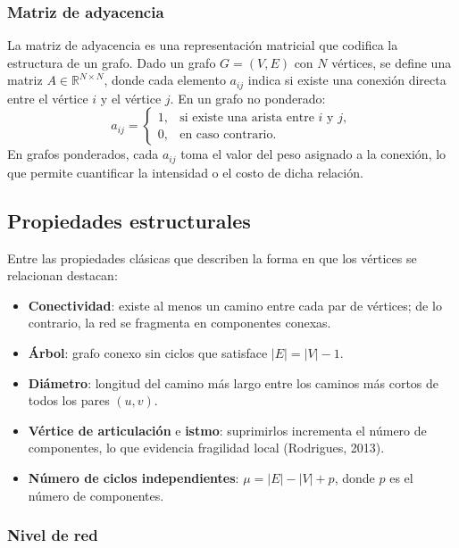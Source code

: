         \subsubsection{Matriz de adyacencia}
            La matriz de adyacencia es una representación matricial que codifica la estructura de un grafo. Dado un grafo $G=(V,E)$ con $N$ vértices, se define una matriz $A \in \mathbb{R}^{N \times N}$, donde cada elemento $a_{ij}$ indica si existe una conexión directa entre el vértice $i$ y el vértice $j$. En un grafo no ponderado:
            \begin{equation}
                a_{ij} =
                \begin{cases}
                    1, & \text{si existe una arista entre } i \text{ y } j,\\
                    0, & \text{en caso contrario.}
                \end{cases}
            \end{equation}
            En grafos ponderados, cada $a_{ij}$ toma el valor del peso asignado a la conexión, lo que permite cuantificar la intensidad o el costo de dicha relación.

    \subsection{Propiedades estructurales}

    Entre las propiedades clásicas que describen la forma en que los vértices se relacionan destacan:
    \begin{itemize}
        \item \textbf{Conectividad}: existe al menos un camino entre cada par de vértices; de lo contrario, la red se fragmenta en componentes conexas.
        \item \textbf{Árbol}: grafo conexo sin ciclos que satisface $|E|=|V|-1$.
        \item \textbf{Diámetro}: longitud del camino más largo entre los caminos más cortos de todos los pares $(u,v)$.
        \item \textbf{Vértice de articulación} e \textbf{istmo}: suprimirlos incrementa el número de componentes, lo que evidencia fragilidad local (Rodrigues, 2013).
        \item \textbf{Número de ciclos independientes}: $\mu = |E|-|V|+p$, donde $p$ es el número de componentes.
    \end{itemize}

    \subsubsection*{Nivel de red}

